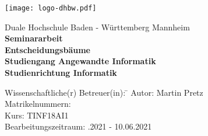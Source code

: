\begin{titlepage}
    \begin{minipage}{\textwidth}
        \vspace{-2cm}
        \texttt{[image: logo-dhbw.pdf]}
    \end{minipage}
    \vspace{1em}

    \begin{center}
		{\textsf{\large Duale Hochschule Baden - W\"urttemberg Mannheim}}\\[4em]
		{\textsf{\textbf{\large{Seminararbeit}}}}\\[6mm]                                 %
		{\textsf{\textbf{\Large{Entscheidungsbäume}}}} \\[1.5cm]                        %
		{\textsf{\textbf{\large{Studiengang Angewandte Informatik}}}}\\[6mm]
		{\textsf{\textbf{Studienrichtung Informatik}}}\vspace{10em}

		\begin{minipage}{\textwidth}
			\begin{tabbing}
				Wissenschaftliche(r) Betreuer(in): \hspace{0.85cm}\=\kill
				Autor: \> Martin Pretz \\[1.5mm]
				Matrikelnummern:  \\[1.5mm]
				Kurs: \> TINF18AI1 \\[1.5mm]
				Bearbeitungszeitraum: .2021 - 10.06.2021 \\[1.5mm]
			\end{tabbing}
		\end{minipage}
	\end{center}
\end{titlepage}